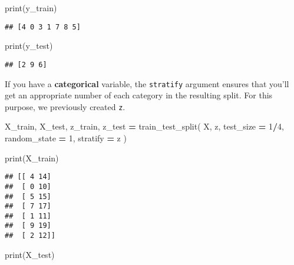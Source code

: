 \documentclass[
]{book}
\newenvironment{Shaded}{\begin{snugshade}}{\end{snugshade}}
\newcommand{\BuiltInTok}[1]{#1}
\newcommand{\DecValTok}[1]{\textcolor[rgb]{0.00,0.00,0.81}{#1}}
\newcommand{\NormalTok}[1]{#1}
\newcommand{\OperatorTok}[1]{\textcolor[rgb]{0.81,0.36,0.00}{\textbf{#1}}}
\begin{document}
\begin{Shaded}
\begin{Highlighting}[]
\BuiltInTok{print}\NormalTok{(y\_train)}
\end{Highlighting}
\end{Shaded}

\begin{verbatim}
## [4 0 3 1 7 8 5]
\end{verbatim}

\begin{Shaded}
\begin{Highlighting}[]
\BuiltInTok{print}\NormalTok{(y\_test)}
\end{Highlighting}
\end{Shaded}

\begin{verbatim}
## [2 9 6]
\end{verbatim}

If you have a \textbf{categorical} variable, the \texttt{stratify} argument ensures
that you'll get an appropriate number of each category in the resulting split.
For this purpose, we previously created \texttt{z}.

\begin{Shaded}
\begin{Highlighting}[]
\NormalTok{X\_train, X\_test, z\_train, z\_test }\OperatorTok{=}\NormalTok{ train\_test\_split(}
\NormalTok{  X, z, test\_size }\OperatorTok{=} \DecValTok{1}\OperatorTok{/}\DecValTok{4}\NormalTok{, random\_state }\OperatorTok{=} \DecValTok{1}\NormalTok{, stratify }\OperatorTok{=}\NormalTok{ z}
\NormalTok{)}
\end{Highlighting}
\end{Shaded}

\begin{Shaded}
\begin{Highlighting}[]
\BuiltInTok{print}\NormalTok{(X\_train)}
\end{Highlighting}
\end{Shaded}

\begin{verbatim}
## [[ 4 14]
##  [ 0 10]
##  [ 5 15]
##  [ 7 17]
##  [ 1 11]
##  [ 9 19]
##  [ 2 12]]
\end{verbatim}

\begin{Shaded}
\begin{Highlighting}[]
\BuiltInTok{print}\NormalTok{(X\_test)}
\end{Highlighting}
\end{Shaded}
\end{document}
